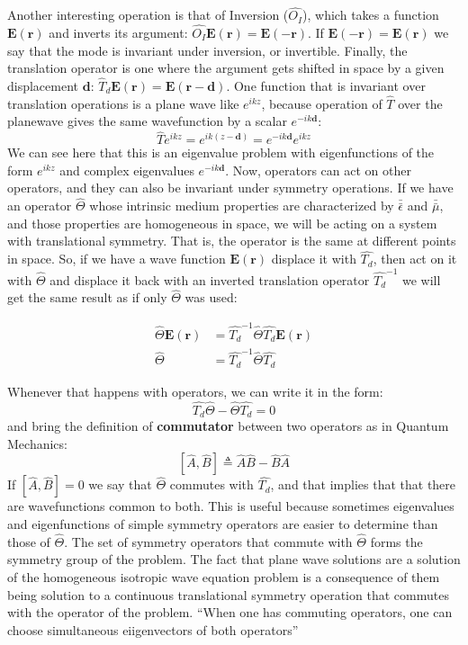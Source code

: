 Another interesting operation is that of Inversion ($\hat{O_I}$), which takes a function $\mathbf{E(r)}$ and inverts its argument: $\hat{O_I}\mathbf{E(r)} = \mathbf{E(-r)}$. If $\mathbf{E(-r)}=\mathbf{E(r)}$ we say that the mode is invariant under inversion, or invertible.
Finally, the translation operator is one where the argument gets shifted in space by a given displacement $\mathbf{d}$: $\hat{T}_d\mathbf{E(r)} = \mathbf{E(r-d)}$. 
One function that is invariant over translation operations is a plane wave like $e^{ikz}$, because operation of $\hat{T}$ over the planewave gives the same wavefunction by a scalar $e^{-ik\mathbf{d}}$:
$$\hat{T}e^{ikz} = e^{ik(z-\mathbf{d})} = e^{-ik\mathbf{d}}e^{ikz}$$
We can see here that this is an eigenvalue problem with eigenfunctions of the form  $e^{ikz}$ and complex eigenvalues $e^{-ik\mathbf{d}}$.
Now, operators can act on other operators, and they can also be invariant under symmetry operations. If we have an operator $\hat{\Theta}$ whose intrinsic medium properties are characterized by $\bar{\bar{\epsilon}}$ and $\bar{\bar{\mu}}$, and those properties are homogeneous in space, we will be acting on a system with translational symmetry. That is, the operator is the same at different points in space.
So, if we have a wave function $\mathbf{E(r)}$ displace it with $\hat{T_d}$, then act on it with $\hat{\Theta}$ and displace it back with an inverted translation operator $\hat{T_d}^{-1}$ we will get the same result as if only $\hat{\Theta}$ was used:

\begin{align*}
\hat{\Theta}\mathbf{E(r)} &= \hat{T_d}^{-1}\hat{\Theta}\hat{T_d}\mathbf{E(r)}\\
\hat{\Theta} &= \hat{T_d}^{-1}\hat{\Theta}\hat{T_d}
\end{align*}

Whenever that happens with operators, we can write it in the form: \[\hat{T_d}\hat{\Theta}-\hat{\Theta}\hat{T_d}=0\]
and bring the definition of \textbf{commutator} between two operators as in Quantum Mechanics: 
\begin{equation}
\left[\hat{A},\hat{B}\right] \triangleq \hat{A}\hat{B}-\hat{B}\hat{A}
\label{eq:commutator}
\end{equation}
If $\left[\hat{A},\hat{B}\right] = 0$ we say that $\hat{\Theta}$ commutes with $\hat{T_d}$, and that implies that that there are wavefunctions common to both.
This is useful because sometimes eigenvalues and eigenfunctions of simple symmetry operators are easier to determine than those of $\hat{\Theta}$.  
The set of symmetry operators that commute with $\hat{\Theta}$ forms the symmetry group of the problem.  
The fact that plane wave solutions are a solution of the homogeneous isotropic wave equation problem is a consequence of them being solution to a continuous translational symmetry operation that commutes with the operator of the problem.
``When one has commuting operators, one can choose simultaneous eiigenvectors of both operators'' \cite	{Joannopoulos2008}

